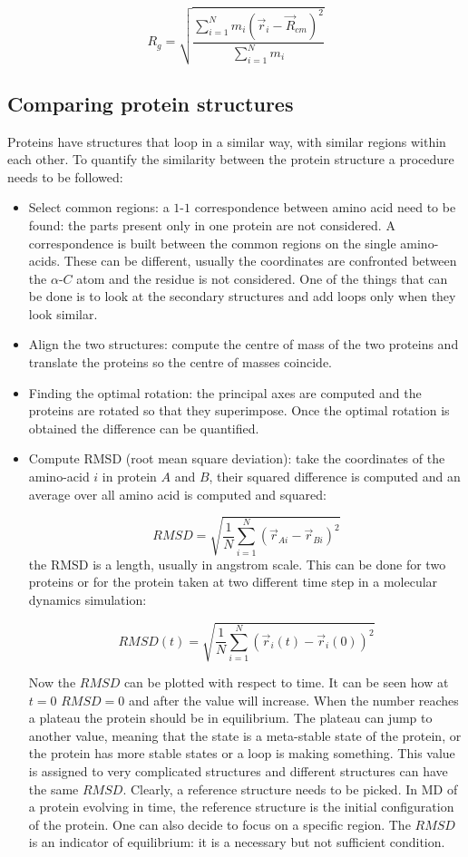 	$$R_g = \sqrt{\frac{\sum\limits_{i=1}^Nm_i(\vec{r}_i-\vec{R}_{cm})^2}{\sum\limits_{i=1}^Nm_i}}$$

	\subsection{Comparing protein structures}
	Proteins have structures that loop in a similar way, with similar regions within each other.
	To quantify the similarity between the protein structure a procedure needs to be followed:

		\begin{itemize}
			\item Select common regions: a $1$-$1$ correspondence between amino acid need to be found: the parts present only in one protein are not considered.
				A correspondence is built between the common regions on the single amino-acids.
				These can be different, usually the coordinates are confronted between the $\alpha$-$C$ atom and the residue is not considered.
				One of the things that can be done is to look at the secondary structures and add loops only when they look similar.
			\item Align the two structures: compute the centre of mass of the two proteins and translate the proteins so the centre of masses coincide.
			\item Finding the optimal rotation: the principal axes are computed and the proteins are rotated so that they superimpose.
				Once the optimal rotation is obtained the difference can be quantified.
			\item Compute RMSD (root mean square deviation): take the coordinates of the amino-acid $i$ in protein $A$ and $B$, their squared difference is computed and an average over all amino acid is computed and squared:

				$$RMSD = \sqrt{\frac{1}{N}\sum\limits_{i=1}^N(\vec{r}_{Ai}-\vec{r}_{Bi})^2}$$
				the RMSD is a length, usually in angstrom scale.
				This can be done for two proteins or for the protein taken at two different time step in a molecular dynamics simulation:

				$$RMSD(t) = \sqrt{\frac{1}{N}\sum\limits_{i=1}^N(\vec{r}_{i}(t)-\vec{r}_{i}(0))^2}$$

				Now the $RMSD$ can be plotted with respect to time.
				It can be seen how at $t=0$ $RMSD=0$ and after the value will increase.
				When the number reaches a plateau the protein should be in equilibrium.
				The plateau can jump to another value, meaning that the state is a meta-stable state of the protein, or the protein has more stable states or a loop is making something.
				This value is assigned to very complicated structures and different structures can have the same $RMSD$.
				Clearly, a reference structure needs to be picked.
				In MD of a protein evolving in time, the reference structure is the initial configuration of the protein.
				One can also decide to focus on a specific region.
				The $RMSD$ is an indicator of equilibrium: it is a necessary but not sufficient condition.
		\end{itemize}

